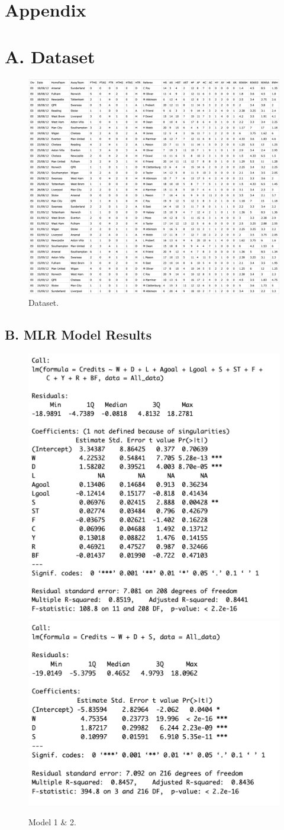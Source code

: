 \documentclass[12pt]{article}
\begin{document}
\newpage

\section*{Appendix}

\section*{A. Dataset}
\label{Dataset}
\begin{figure}[h]
    \centering
    \includegraphics[scale=0.5]{Dataset.png}
    \caption{Dataset.}
\end{figure}

\newpage
\subsection*{B. MLR Model Results}
\label{Models}
\begin{figure}[h]
    \centering
    \includegraphics[width=0.32\linewidth]{m1.png}
    \includegraphics[width=0.32\linewidth]{m2.png}
    \caption{Model 1 \& 2.}
\end{figure}
\end{document}

